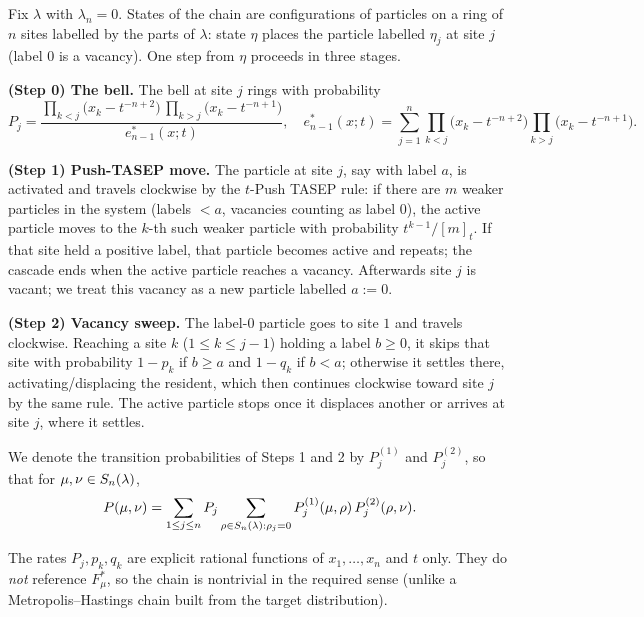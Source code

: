 \begin{qthreedefinition}\label{def:chain}
Fix $\lambda$ with $\lambda_n=0$. States of the chain are configurations of
particles on a ring of $n$ sites labelled by the parts of $\lambda$: state $\eta$
places the particle labelled $\eta_j$ at site $j$ (label $0$ is a vacancy). One
step from $\eta$ proceeds in three stages.

\smallskip
\noindent\textbf{(Step 0) The bell.} The bell at site $j$ rings with probability
\[
P_j=\frac{\prod_{k<j}\bigl(x_k-t^{-n+2}\bigr)\,\prod_{k>j}\bigl(x_k-t^{-n+1}\bigr)}
{e^*_{n-1}(x;t)},
\quad
e^*_{n-1}(x;t)=\sum_{j=1}^n\prod_{k<j}\bigl(x_k-t^{-n+2}\bigr)\prod_{k>j}\bigl(x_k-t^{-n+1}\bigr).
\]

\smallskip
\noindent\textbf{(Step 1) Push-TASEP move.} The particle at site $j$, say with
label $a$, is activated and travels clockwise by the $t$-Push TASEP rule: if
there are $m$ weaker particles in the system (labels $<a$, vacancies counting as
label $0$), the active particle moves to the $k$-th such weaker particle with
probability $t^{k-1}/[m]_t$. If that site held a positive label, that particle
becomes active and repeats; the cascade ends when the active particle reaches a
vacancy. Afterwards site $j$ is vacant; we treat this vacancy as a new particle
labelled $a:=0$.

\smallskip
\noindent\textbf{(Step 2) Vacancy sweep.} The label-$0$ particle goes to site $1$
and travels clockwise. Reaching a site $k$ ($1\le k\le j-1$) holding a label
$b\ge0$, it skips that site with probability $1-p_k$ if $b\ge a$ and $1-q_k$ if
$b<a$; otherwise it settles there, activating/displacing the resident, which then
continues clockwise toward site $j$ by the same rule. The active particle stops
once it displaces another or arrives at site $j$, where it settles.
\end{qthreedefinition}

We denote the transition probabilities of Steps 1 and 2 by $P^{(1)}_j$ and
$P^{(2)}_j$, so that for $\mu,\nu\in S_n(\lambda)$,
\[
P(\mu,\nu)=\sum_{1\le j\le n}P_j\sum_{\rho\in S_n(\lambda):\rho_j=0}
P^{(1)}_j(\mu,\rho)\,P^{(2)}_j(\rho,\nu).
\]

\begin{qthreeremark}[nontriviality]
The rates $P_j,p_k,q_k$ are explicit rational functions of $x_1,\dots,x_n$ and
$t$ only. They do \emph{not} reference $F^*_\mu$, so the chain is nontrivial in
the required sense (unlike a Metropolis--Hastings chain built from the target
distribution).
\end{qthreeremark}

